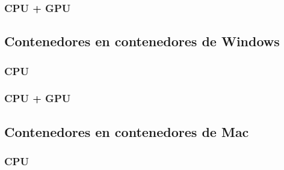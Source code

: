 \subsubsection{CPU + GPU}

\subsection{Contenedores en contenedores de Windows}
\subsubsection{CPU}

\subsubsection{CPU + GPU}

\subsection{Contenedores en contenedores de Mac}
\subsubsection{CPU}

